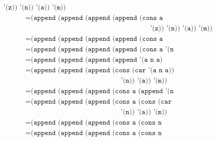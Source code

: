 \documentclass[letterpaper,11pt]{article}
\begin{document}
\begin{enumerate}
\begin{enumerate}
\begin{align*}
            \; \; \; \; \; \; \; \; \; \; \; \; \; \; \; \; \; \; \; \; \; \; \;
            \; \; \; \; \; \; \; \; \; \; \; \; \; \; \; \; \; \;
                                                       \texttt{'(z)) '(n)) '(a)) '(m))} \\
            &= \texttt{(append (append (append (append (cons a (cons n (append '() '(a))))} \\ 
            & \; \; \; \; \; \; \; \; \; \; \; \; \; \; \; \; \; \; \; \; \; \; \;
            \; \; \; \; \; \; \; \; \; \; \; \; \; \; \; \; \; \; \; \; \; \; \;
            \; \; \; \; \; \; \; \; \; \; \; \; \; \; \; \; \; \;
                                                       \texttt{'(z)) '(n)) '(a)) '(m))} \\
            &= \texttt{(append (append (append (append (cons a (cons n '(a))) '(z)) '(n)) '(a)) '(m))} \\
            &= \texttt{(append (append (append (append (cons a '(n a)) '(z)) '(n)) '(a)) '(m))} \\
            &= \texttt{(append (append (append (append '(a n a) '(z)) '(n)) '(a)) '(m))} \\
            &= \texttt{(append (append (append (cons (car '(a n a)) (append (cdr '(a n a)) '(z)))} \\
            & \; \; \; \; \; \; \; \; \; \; \; \; \; \; \; \; \; \; \; \; \; \; \;
            \; \; \; \; \; \; \; \; \; \; \; \; \; \; \; \; \; \; \; \; \; \; \;
            \; \; \; 
                                               \texttt{'(n)) '(a)) '(m))} \\
            &= \texttt{(append (append (append (cons a (append '(n a) '(z))) '(n)) '(a)) '(m))} \\
            &= \texttt{(append (append (append (cons a (cons (car '(n a)) (append (cdr '(n a)) '(z))))} \\
            & \; \; \; \; \; \; \; \; \; \; \; \; \; \; \; \; \; \; \; \; \; \; \;
            \; \; \; \; \; \; \; \; \; \; \; \; \; \; \; \; \; \; \; \; \; \; \;
            \; \; \; 
                                               \texttt{'(n)) '(a)) '(m))} \\
            &= \texttt{(append (append (append (cons a (cons n (append '(a) '(z)))) '(n)) '(a)) '(m))} \\
            &= \texttt{(append (append (append (cons a (cons n (cons (car '(a)) (append (cdr '(a)) '(z)))))} \\
            & \; \; \; \; \; \; \; \; \; \; \; \; \; \; \; \; \; \; \; \; \; \; \;

\end{align*}
\end{enumerate}
\end{enumerate}
\end{document}
